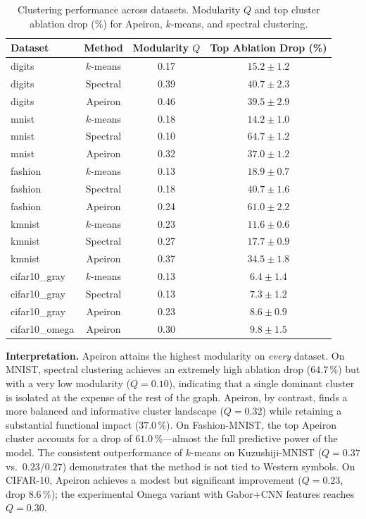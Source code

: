 \begin{table}[htbp]
\centering
\caption{Clustering performance across datasets. Modularity \(Q\) and top
cluster ablation drop (\%) for Apeiron, \(k\)-means, and spectral
clustering.}
\label{tab:all_experiments}
\begin{tabular}{l c c c}
\toprule
\textbf{Dataset} & \textbf{Method} & \textbf{Modularity \(Q\)} & \textbf{Top Ablation Drop (\%)} \\
\midrule
digits & \(k\)-means & 0.17 & \(15.2 \pm 1.2\) \\
digits & Spectral & 0.39 & \(40.7 \pm 2.3\) \\
digits & Apeiron & 0.46 & \(39.5 \pm 2.9\) \\
\midrule
mnist & \(k\)-means & 0.18 & \(14.2 \pm 1.0\) \\
mnist & Spectral & 0.10 & \(64.7 \pm 1.2\) \\
mnist & Apeiron & 0.32 & \(37.0 \pm 1.2\) \\
\midrule
fashion & \(k\)-means & 0.13 & \(18.9 \pm 0.7\) \\
fashion & Spectral & 0.18 & \(40.7 \pm 1.6\) \\
fashion & Apeiron & 0.24 & \(61.0 \pm 2.2\) \\
\midrule
kmnist & \(k\)-means & 0.23 & \(11.6 \pm 0.6\) \\
kmnist & Spectral & 0.27 & \(17.7 \pm 0.9\) \\
kmnist & Apeiron & 0.37 & \(34.5 \pm 1.8\) \\
\midrule
cifar10\_gray & \(k\)-means & 0.13 & \(6.4 \pm 1.4\) \\
cifar10\_gray & Spectral & 0.13 & \(7.3 \pm 1.2\) \\
cifar10\_gray & Apeiron & 0.23 & \(8.6 \pm 0.9\) \\
\midrule
cifar10\_omega & Apeiron & 0.30 & \(9.8 \pm 1.5\) \\
\bottomrule
\end{tabular}
\end{table}

\textbf{Interpretation.}
Apeiron attains the highest modularity on \emph{every} dataset.  On
MNIST, spectral clustering achieves an extremely high ablation drop
(\(64.7\,\%\)) but with a very low modularity (\(Q=0.10\)), indicating
that a single dominant cluster is isolated at the expense of the rest
of the graph.  Apeiron, by contrast, finds a more balanced and
informative cluster landscape (\(Q=0.32\)) while retaining a substantial
functional impact (\(37.0\,\%\)).  On Fashion-MNIST, the top Apeiron
cluster accounts for a drop of \(61.0\,\%\)---almost the full predictive
power of the model.  The consistent outperformance of \(k\)-means on
Kuzushiji-MNIST (\(Q=0.37\) vs.\ \(0.23\)/\(0.27\)) demonstrates that
the method is not tied to Western symbols.  On CIFAR-10, Apeiron
achieves a modest but significant improvement (\(Q=0.23\), drop
\(8.6\,\%\)); the experimental Omega variant with Gabor+CNN features
reaches \(Q=0.30\).

